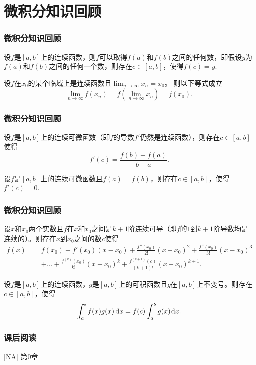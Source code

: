 \documentclass[10pt]{beamer}
\def\dx{\,{\rm d}x}
\begin{document}

\section{微积分知识回顾}
\begin{frame}
\frametitle{微积分知识回顾}
\begin{theorem}[中值定理]
设$f$是$[a,b]$上的连续函数，则$f$可以取得$f(a)$和$f(b)$之间的任何数，即假设$y$为$f(a)$和$f(b)$之间的任何一个数，则存在$c \in [a,b]$，使得$f(c) = y$.
\end{theorem}

\begin{theorem}[连续极限]
设$f$在$x_0$的某个临域上是连续函数且$\lim_{n \rightarrow \infty} x_n = x_0$。 则以下等式成立
\begin{equation}
\lim_{n \rightarrow \infty} f(x_n) = f(\lim_{n \rightarrow \infty} x_n) = f(x_0).
\end{equation}


\end{theorem}

\end{frame}

\begin{frame}
\frametitle{微积分知识回顾}
\begin{theorem}[微分中值定理]
设$f$是$[a,b]$上的连续可微函数（即$f$的导数$f'$仍然是连续函数），则存在$c \in [a,b]$使得
\begin{equation}
f'(c) = \frac{f(b)- f(a)}{b-a}.
\end{equation}
\end{theorem}

\begin{theorem}[Rolle定理]
设$f$是$[a,b]$上的连续可微函数且$f(a) = f(b)$，则存在$c \in [a,b]$，使得$f'(c) = 0$.
\end{theorem}


\end{frame}

\begin{frame}
\frametitle{微积分知识回顾}
\begin{theorem}[带余项的Taylor定理]
设$x$和$x_0$两个实数且$f$在$x$和$x_0$之间是$k+1$阶连续可导（即$f$的$1$到$k+1$阶导数均是连续的）。则存在$x$到$x_0$之间的数$c$使得
\begin{align}
f(x) = &f(x_0) + f'(x_0)(x-x_0) + \frac{f''(x_0)}{2!}(x-x_0)^2 + \frac{f''(x_0)}{3!}(x-x_0)^3  \nonumber \\
         &+ \ldots +\frac{f^{(k)}(x_0)}{k!}(x-x_0)^k +\frac{f^{(k+1)}(c)}{(k+1)!}(x-x_0)^{k+1}.
\end{align}
\end{theorem}

\begin{theorem}[积分中值定理]
设$f$是$[a,b]$上的连续函数，$g$是$[a,b]$上的可积函数且$g$在$[a,b]$上不变号。则存在$c \in [a,b]$，使得
\begin{equation}
\int_a^b f(x) g(x) \dx = f(c) \int_a^b g(x) \dx.
\end{equation}
\end{theorem}


\end{frame}


\begin{frame}
\frametitle{课后阅读}
[NA] 第0章


\end{frame}
\end{document}
